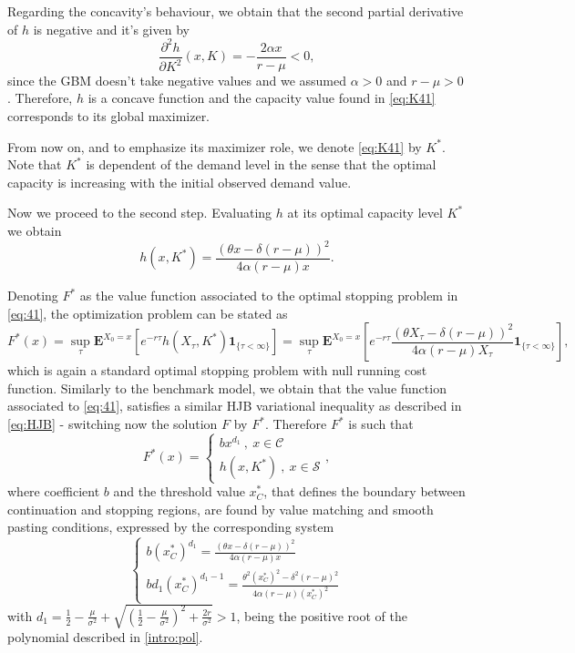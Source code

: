 Regarding the concavity's behaviour, we obtain that the second partial derivative of $h$ is negative and it's given by
$$\frac{\partial^2 h }{\partial K^2}(x,K)=  -\frac{2\alpha x}{r-\mu}<0, $$
since the GBM doesn't take negative values and we assumed $\alpha>0$ and $r-\mu>0$ . Therefore, $h$ is a concave function and the capacity value found in \eqref{eq:K41} corresponds to its global maximizer.

From now on, and to emphasize its maximizer role, we denote \eqref{eq:K41} by $K^*$.
Note that $K^*$ is dependent of the demand level in the sense that the optimal capacity is increasing with the initial observed demand value.

Now we proceed to the second step. Evaluating $h$ at its optimal capacity level $K^*$ we obtain
$$h(x,K^*)=\frac{(\theta x -\delta (r-\mu))^2}{4 \alpha (r-\mu) x}.$$

Denoting $F^*$ as the value function associated to the optimal stopping problem in \eqref{eq:41}, the optimization problem can be stated as
\begin{equation}
F^*(x)=\sup_\tau \textbf{E}^{X_0=x}\left[ e^{-r\tau}h(X_\tau,K^*) \textbf{1}_{\{\tau<\infty\}} \right]
= \sup_\tau \textbf{E}^{X_0=x}\left[ e^{-r\tau} \frac{(\theta X_\tau -\delta (r-\mu))^2}{4 \alpha (r-\mu) X_\tau} \textbf{1}_{\{\tau<\infty\}}\right],
\label{eq:41}
\end{equation}
which is again a standard optimal stopping problem with null running cost function. Similarly to the benchmark model, we obtain that the value function associated to \eqref{eq:41}, satisfies a similar HJB variational inequality as described in \eqref{eq:HJB} - switching now the solution $F$ by $F^*$. Therefore $F^*$ is such that
\begin{equation}
F^*(x)=\begin{cases} b x^{d_1}  \ , \ x \in \mathcal{C} \\
h(x,K^*) \ , \ x \in \mathcal{S}
\end{cases},
\label{1_F*}
\end{equation}
where coefficient $b$ and the threshold value $x_C^*$, that defines the boundary between continuation and stopping regions, are found by value matching and smooth pasting conditions, expressed by the corresponding system
\begin{equation}
\begin{cases} b (x_C^*)^{d_1}=\frac{(\theta x -\delta (r-\mu))^2}{4 \alpha (r-\mu) x} \\
b d_1(x_C^*)^{d_1-1}=\frac{\theta^2 (x_C^*)^2 -\delta^2 (r-\mu)^2}{4 \alpha (r-\mu) (x_C^*)^2}
\end{cases}
\label{eq:sistema3}
\end{equation}
with $d_1=\frac{1}{2}-\frac{\mu}{\sigma^2} +\sqrt{\left( \frac{1}{2} -\frac{\mu}{\sigma^2} \right) ^2+ \frac{2r}{\sigma^2}}>1$, being the positive root of the polynomial described in \eqref{intro:pol}.

